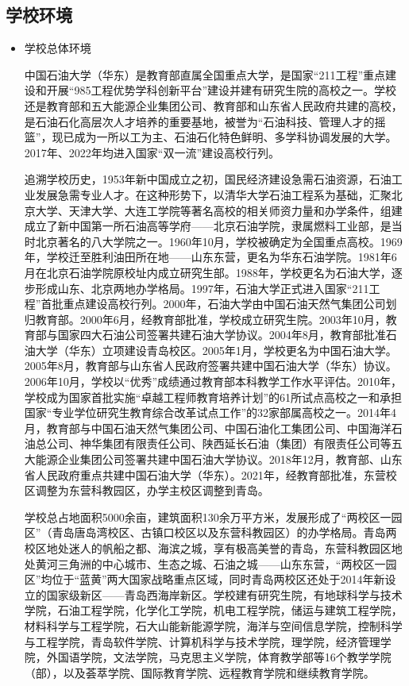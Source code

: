 \documentclass{article}
\begin{document}
\subsection{学校环境}
\begin{itemize}
\item 学校总体环境\par
中国石油大学（华东）是教育部直属全国重点大学，是国家“211工程”重点建设和开展“985工程优势学科创新平台”建设并建有研究生院的高校之一。学校还是教育部和五大能源企业集团公司、教育部和山东省人民政府共建的高校，是石油石化高层次人才培养的重要基地，被誉为“石油科技、管理人才的摇篮”，现已成为一所以工为主、石油石化特色鲜明、多学科协调发展的大学。2017年、2022年均进入国家“双一流”建设高校行列。

追溯学校历史，1953年新中国成立之初，国民经济建设急需石油资源，石油工业发展急需专业人才。在这种形势下，以清华大学石油工程系为基础，汇聚北京大学、天津大学、大连工学院等著名高校的相关师资力量和办学条件，组建成立了新中国第一所石油高等学府——北京石油学院，隶属燃料工业部，是当时北京著名的八大学院之一。1960年10月，学校被确定为全国重点高校。1969年，学校迁至胜利油田所在地——山东东营，更名为华东石油学院。1981年6月在北京石油学院原校址内成立研究生部。1988年，学校更名为石油大学，逐步形成山东、北京两地办学格局。1997年，石油大学正式进入国家“211工程”首批重点建设高校行列。2000年，石油大学由中国石油天然气集团公司划归教育部。2000年6月，经教育部批准，学校成立研究生院。2003年10月，教育部与国家四大石油公司签署共建石油大学协议。2004年8月，教育部批准石油大学（华东）立项建设青岛校区。2005年1月，学校更名为中国石油大学。2005年8月，教育部与山东省人民政府签署共建中国石油大学（华东）协议。2006年10月，学校以“优秀”成绩通过教育部本科教学工作水平评估。2010年，学校成为国家首批实施“卓越工程师教育培养计划”的61所试点高校之一和承担国家“专业学位研究生教育综合改革试点工作”的32家部属高校之一。2014年4月，教育部与中国石油天然气集团公司、中国石油化工集团公司、中国海洋石油总公司、神华集团有限责任公司、陕西延长石油（集团）有限责任公司等五大能源企业集团公司签署共建中国石油大学协议。2018年12月，教育部、山东省人民政府重点共建中国石油大学（华东）。2021年，经教育部批准，东营校区调整为东营科教园区，办学主校区调整到青岛。

学校总占地面积5000余亩，建筑面积130余万平方米，发展形成了“两校区一园区”（青岛唐岛湾校区、古镇口校区以及东营科教园区）的办学格局。青岛两校区地处迷人的帆船之都、海滨之城，享有极高美誉的青岛，东营科教园区地处黄河三角洲的中心城市、生态之城、石油之城——山东东营，“两校区一园区”均位于“蓝黄”两大国家战略重点区域，同时青岛两校区还处于2014年新设立的国家级新区——青岛西海岸新区。学校建有研究生院，有地球科学与技术学院，石油工程学院，化学化工学院，机电工程学院，储运与建筑工程学院，材料科学与工程学院，石大山能新能源学院，海洋与空间信息学院，控制科学与工程学院，青岛软件学院、计算机科学与技术学院，理学院，经济管理学院，外国语学院，文法学院，马克思主义学院，体育教学部等16个教学学院（部），以及荟萃学院、国际教育学院、远程教育学院和继续教育学院。


\end{itemize}
\end{document}
